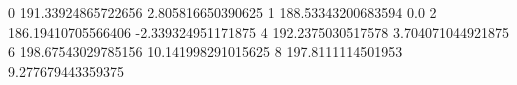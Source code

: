 0 191.33924865722656 2.805816650390625
1 188.53343200683594 0.0
2 186.19410705566406 -2.339324951171875
4 192.2375030517578 3.704071044921875
6 198.67543029785156 10.141998291015625
8 197.8111114501953 9.277679443359375
